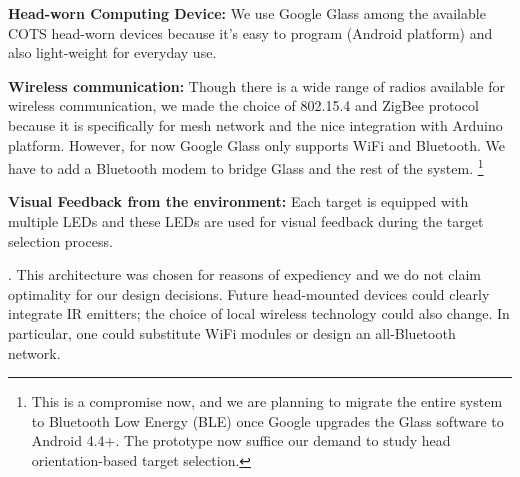 {\bf Head-worn Computing Device:} We use Google Glass among the available COTS head-worn devices because it's easy to program (Android platform) and also light-weight for everyday use.


{\bf Wireless communication:} Though there is a wide range of radios available for wireless communication, we made the choice of 802.15.4 and ZigBee protocol because it is specifically for mesh network and the nice integration with Arduino platform. However, for now Google Glass only supports WiFi and Bluetooth. We have to add a Bluetooth modem to bridge Glass and the rest of the system. \footnote{This is a compromise now, and we are planning to migrate the entire system to Bluetooth Low Energy (BLE) once Google upgrades the Glass software to Android 4.4+. The prototype now suffice our demand to study head orientation-based target selection.}
 
{\bf Visual Feedback from the environment:} Each target is equipped with multiple LEDs and these LEDs are used for visual feedback during the target selection process. 

.
This architecture was chosen for reasons of expediency and we do not claim optimality for our design decisions. Future head-mounted devices could clearly integrate IR emitters; the choice of local wireless technology could also change. In particular, one could substitute WiFi modules or design an all-Bluetooth network.


